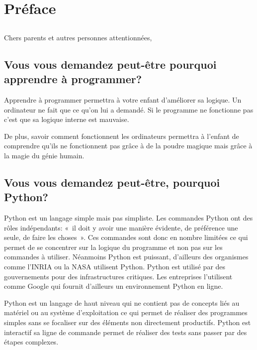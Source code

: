 



\markboth{}{}

\chapter{Préface}
\section*{}

Chers parents et autres personnes attentionnées,\\

\section*{Vous vous demandez peut-être pourquoi apprendre à programmer?}
Apprendre à programmer permettra à votre enfant d'améliorer sa logique. Un ordinateur ne fait que ce qu'on lui a demandé. Si le programme ne fonctionne pas c'est que sa logique interne est mauvaise. 

De plus, savoir comment fonctionnent les ordinateurs permettra à l'enfant de comprendre qu'ils ne fonctionnent pas grâce à de la poudre magique mais grâce à la magie du génie humain.


\section*{Vous vous demandez peut-être, pourquoi Python?}
Python est un langage simple mais pas simpliste. Les commandes Python ont des rôles indépendants: «~il doit y avoir une manière évidente, de préférence une seule, de faire les choses~». Ces commandes sont donc en nombre limitées ce qui permet de se concentrer sur la logique du programme et non pas sur les commandes à utiliser. 
Néanmoins Python est puissant, d'ailleurs des organismes comme l'INRIA ou la NASA utilisent Python. Python est utilisé par des gouvernements pour des infrastructures critiques. Les entreprises l'utilisent comme Google qui fournit d'ailleurs un environnement Python en ligne.

Python est un langage de haut niveau qui ne contient pas de concepts liés au matériel ou au système d'exploitation ce qui permet de réaliser des programmes simples sans se focaliser sur des éléments non directement productifs. Python est interactif sa ligne de commande permet de réaliser des tests sans passer par des étapes complexes.

